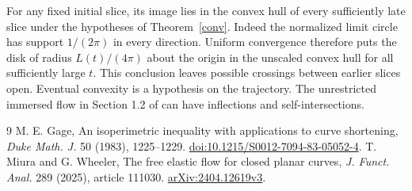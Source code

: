 \documentclass[10pt]{article}
\begin{document}
For any fixed initial slice, its image lies in the convex hull of every
sufficiently late slice under the hypotheses of Theorem~\ref{conv}.
Indeed the normalized limit circle has support \(1/(2\pi)\) in every
direction. Uniform convergence therefore puts the disk of radius
\(L(t)/(4\pi)\) about the origin in the unscaled convex hull for all
sufficiently large \(t\). This conclusion leaves possible crossings
between earlier slices open. Eventual convexity is a hypothesis on the
trajectory. The unrestricted immersed flow in Section 1.2 of \cite{mw}
can have inflections and self-intersections.

\begin{thebibliography}{9}
 M. E. Gage,
An isoperimetric inequality with applications to curve shortening,
\emph{Duke Math. J.} 50 (1983), 1225--1229.
\href{https://doi.org/10.1215/S0012-7094-83-05052-4}{doi:10.1215/S0012-7094-83-05052-4}.
 T. Miura and G. Wheeler,
The free elastic flow for closed planar curves,
\emph{J. Funct. Anal.} 289 (2025), article 111030.
\href{https://arxiv.org/html/2404.12619v3}{arXiv:2404.12619v3}.
\end{thebibliography}
\end{document}
